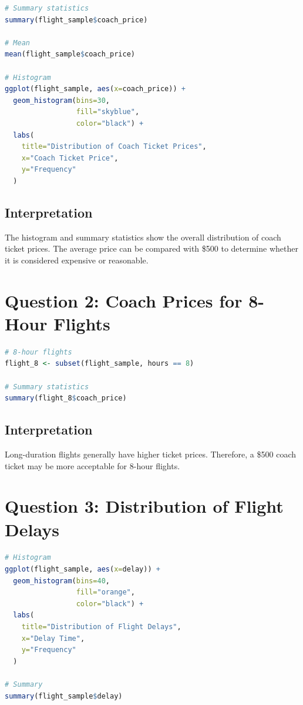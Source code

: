 \documentclass[12pt,a4paper]{article}
\begin{document}
\begin{lstlisting}[language=R, caption=Coach Ticket Price Analysis]
# Summary statistics
summary(flight_sample$coach_price)

# Mean
mean(flight_sample$coach_price)

# Histogram
ggplot(flight_sample, aes(x=coach_price)) +
  geom_histogram(bins=30,
                 fill="skyblue",
                 color="black") +
  labs(
    title="Distribution of Coach Ticket Prices",
    x="Coach Ticket Price",
    y="Frequency"
  )
\end{lstlisting}

\subsection{Interpretation}
The histogram and summary statistics show the overall distribution of coach ticket prices. The average price can be compared with \$500 to determine whether it is considered expensive or reasonable.

\section{Question 2: Coach Prices for 8-Hour Flights}

\begin{lstlisting}[language=R, caption=8 Hour Flight Analysis]
# 8-hour flights
flight_8 <- subset(flight_sample, hours == 8)

# Summary statistics
summary(flight_8$coach_price)
\end{lstlisting}

\subsection{Interpretation}
Long-duration flights generally have higher ticket prices. Therefore, a \$500 coach ticket may be more acceptable for 8-hour flights.

\section{Question 3: Distribution of Flight Delays}

\begin{lstlisting}[language=R, caption=Flight Delay Distribution]
# Histogram
ggplot(flight_sample, aes(x=delay)) +
  geom_histogram(bins=40,
                 fill="orange",
                 color="black") +
  labs(
    title="Distribution of Flight Delays",
    x="Delay Time",
    y="Frequency"
  )

# Summary
summary(flight_sample$delay)
\end{lstlisting}
\end{document}
